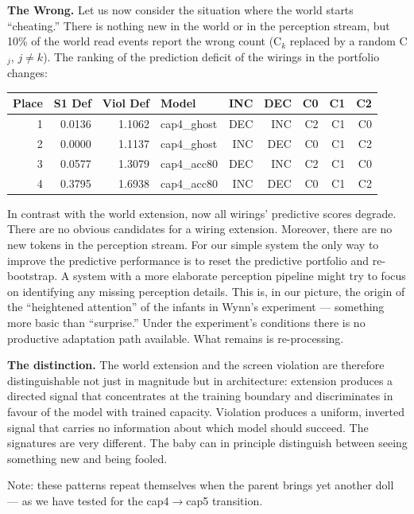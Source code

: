 \documentclass[12pt, a4paper]{article}
\begin{document}
\textbf{The Wrong.} Let us now consider the situation where the world starts
``cheating.'' There is nothing new in the world or in the perception stream,
but 10\% of the world read events report the wrong count (C$_k$ replaced by a
random C$_j$, $j \neq k$). The ranking of the prediction deficit of the
wirings in the portfolio changes:

\begin{center}
\begin{tabular}{rrrlrrrrr}
\toprule
Place & S1 Def & Viol Def & Model & INC & DEC & C0 & C1 & C2 \\
\midrule
1 & 0.0136 & 1.1062 & cap4\_ghost & DEC & INC & C2 & C1 & C0 \\
2 & 0.0000 & 1.1137 & cap4\_ghost & INC & DEC & C0 & C1 & C2 \\
3 & 0.0577 & 1.3079 & cap4\_acc80 & DEC & INC & C2 & C1 & C0 \\
4 & 0.3795 & 1.6938 & cap4\_acc80 & INC & DEC & C0 & C1 & C2 \\
\bottomrule
\end{tabular}
\end{center}

In contrast with the world extension, now all wirings' predictive scores
degrade. There are no obvious candidates for a wiring extension. Moreover,
there are no new tokens in the perception stream. For our simple system the
only way to improve the predictive performance is to reset the predictive
portfolio and re-bootstrap. A system with a more elaborate perception pipeline
might try to focus on identifying any missing perception details. This is, in
our picture, the origin of the ``heightened attention'' of the infants in
Wynn's experiment --- something more basic than ``surprise.'' Under the
experiment's conditions there is no productive adaptation path available. What
remains is re-processing.

\textbf{The distinction.} The world extension and the screen violation are
therefore distinguishable not just in magnitude but in architecture: extension
produces a directed signal that concentrates at the training boundary and
discriminates in favour of the model with trained capacity. Violation produces
a uniform, inverted signal that carries no information about which model should
succeed. The signatures are very different. The baby can in principle
distinguish between seeing something new and being fooled.

Note: these patterns repeat themselves when the parent brings yet another doll
--- as we have tested for the cap4$\to$cap5 transition.
\end{document}
